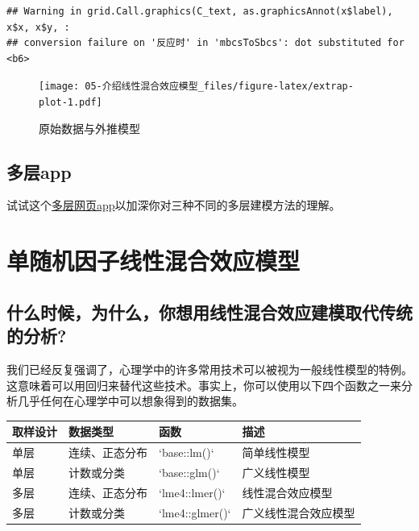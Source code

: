 \documentclass[
]{book}
\begin{document}
\begin{verbatim}
## Warning in grid.Call.graphics(C_text, as.graphicsAnnot(x$label), x$x, x$y, :
## conversion failure on '反应时' in 'mbcsToSbcs': dot substituted for <b6>
\end{verbatim}

\begin{figure}
\centering
\texttt{[image: 05-介绍线性混合效应模型\_files/figure-latex/extrap-plot-1.pdf]}
\caption{\label{fig:extrap-plot}原始数据与外推模型}
\end{figure}

\hypertarget{ux591aux5c42app}{%
\section{多层app}\label{ux591aux5c42app}}

试试这个\href{https://rstudio-connect.psy.gla.ac.uk/multilevel}{多层网页app}以加深你对三种不同的多层建模方法的理解。

\hypertarget{ux5355ux968fux673aux56e0ux5b50ux7ebfux6027ux6df7ux5408ux6548ux5e94ux6a21ux578b}{%
\chapter{单随机因子线性混合效应模型}\label{ux5355ux968fux673aux56e0ux5b50ux7ebfux6027ux6df7ux5408ux6548ux5e94ux6a21ux578b}}

\hypertarget{ux4ec0ux4e48ux65f6ux5019ux4e3aux4ec0ux4e48ux4f60ux60f3ux7528ux7ebfux6027ux6df7ux5408ux6548ux5e94ux5efaux6a21ux53d6ux4ee3ux4f20ux7edfux7684ux5206ux6790}{%
\section{什么时候，为什么，你想用线性混合效应建模取代传统的分析?}\label{ux4ec0ux4e48ux65f6ux5019ux4e3aux4ec0ux4e48ux4f60ux60f3ux7528ux7ebfux6027ux6df7ux5408ux6548ux5e94ux5efaux6a21ux53d6ux4ee3ux4f20ux7edfux7684ux5206ux6790}}

我们已经反复强调了，心理学中的许多常用技术可以被视为一般线性模型的特例。这意味着可以用回归来替代这些技术。事实上，你可以使用以下四个函数之一来分析几乎任何在心理学中可以想象得到的数据集。

\begin{tabular}{l|l|l|l}
\hline
取样设计 & 数据类型 & 函数 & 描述\\
\hline
单层 & 连续、正态分布 & `base::lm()` & 简单线性模型\\
\hline
单层 & 计数或分类 & `base::glm()` & 广义线性模型\\
\hline
多层 & 连续、正态分布 & `lme4::lmer()` & 线性混合效应模型\\
\hline
多层 & 计数或分类 & `lme4::glmer()` & 广义线性混合效应模型\\
\hline
\end{tabular}
\end{document}
